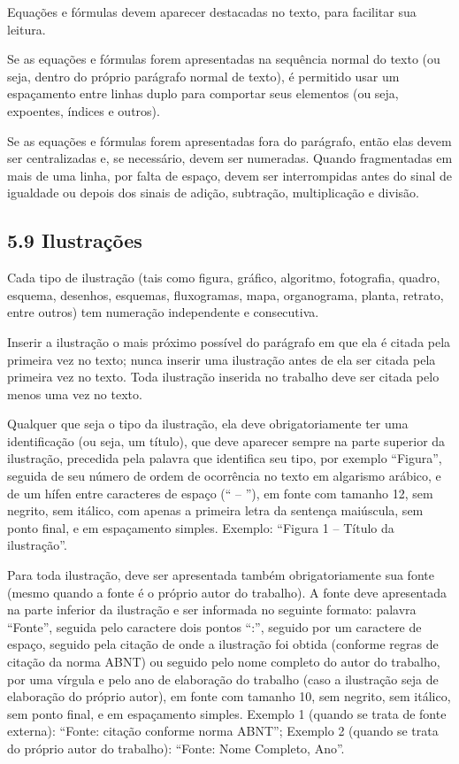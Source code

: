 \documentclass[
	12pt,				%
	oneside,			%
	a4paper,			%
	english,			%
	brazil				%
	]{abntex2ppgsi}
\begin{document}
\begin{anexosenv}
Equações e fórmulas devem aparecer destacadas no texto, para facilitar sua leitura. 

Se as equações e fórmulas forem apresentadas na sequência normal do texto (ou seja, dentro do próprio parágrafo normal de texto), é permitido usar um espaçamento entre linhas duplo para comportar seus elementos (ou seja, expoentes, índices e outros). 

Se as equações e fórmulas forem apresentadas fora do parágrafo, então elas devem ser centralizadas e, se necessário, devem ser numeradas. Quando fragmentadas em mais de uma linha, por falta de espaço, devem ser interrompidas antes do sinal de igualdade ou depois dos sinais de adição, subtração, multiplicação e divisão.

\subsection*{5.9 Ilustrações}

Cada tipo de ilustração (tais como figura, gráfico, algoritmo, fotografia, quadro, esquema, desenhos, esquemas, fluxogramas, mapa, organograma, planta, retrato, entre outros) tem numeração independente e consecutiva. 

Inserir a ilustração o mais próximo possível do parágrafo em que ela é citada pela primeira vez no texto; nunca inserir uma ilustração antes de ela ser citada pela primeira vez no texto. Toda ilustração inserida no trabalho deve ser citada pelo menos uma vez no texto.

Qualquer que seja o tipo da ilustração, ela deve obrigatoriamente ter uma identificação (ou seja, um título), que deve aparecer sempre na parte superior da ilustração, precedida pela palavra que identifica seu tipo, por exemplo ``Figura'', seguida de seu número de ordem de ocorrência no texto em algarismo arábico, e de um hífen entre caracteres de espaço (`` – ''), em fonte com tamanho 12, sem negrito, sem itálico, com apenas a primeira letra da sentença maiúscula, sem ponto final, e em espaçamento simples. Exemplo: ``Figura 1 – Título da ilustração''.

Para toda ilustração, deve ser apresentada também obrigatoriamente sua fonte (mesmo quando a fonte é o próprio autor do trabalho). A fonte deve apresentada na parte inferior da ilustração e ser informada no seguinte formato: palavra ``Fonte'', seguida pelo caractere dois pontos ``:'', seguido por um caractere de espaço, seguido pela citação de onde a ilustração foi obtida (conforme regras de citação da norma ABNT) ou seguido pelo nome completo do autor do trabalho, por uma vírgula e pelo ano de elaboração do trabalho (caso a ilustração seja de elaboração do próprio autor), em fonte com tamanho 10, sem negrito, sem itálico, sem ponto final, e em espaçamento simples. Exemplo 1 (quando se trata de fonte externa): ``Fonte: citação conforme norma ABNT''; Exemplo 2 (quando se trata do próprio autor do trabalho): ``Fonte: Nome Completo, Ano''.


\end{anexosenv}
\end{document}
